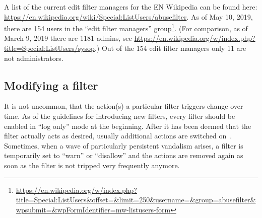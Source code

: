 A list of the current edit filter managers for the EN Wikipedia can be found here: \url{https://en.wikipedia.org/wiki/Special:ListUsers/abusefilter}.
As of May 10, 2019, there are 154 users in the ``edit filter managers'' group\footnote{\url{https://en.wikipedia.org/w/index.php?title=Special:ListUsers&offset=&limit=250&username=&group=abusefilter&wpsubmit=&wpFormIdentifier=mw-listusers-form}}.
(For comparison, as of March 9, 2019 there are 1181 admins, see \url{https://en.wikipedia.org/w/index.php?title=Special:ListUsers/sysop}.)
Out of the 154 edit filter managers only 11 are not administrators.

\subsection{Modifying a filter}
It is not uncommon, that the action(s) a particular filter triggers change over time.
As of the guidelines for introducing new filters, every filter should be enabled in ``log only'' mode at the beginning.
After it has been deemed that the filter actually acts as desired, usually additional actions are switched on~\cite{Wikipedia:EditFilterInstructions}.
Sometimes, when a wave of particularly persistent vandalism arises, a filter is temporarily set to ``warn'' or ``disallow'' and the actions are removed again as soon as the filter is not tripped very frequently anymore. %

